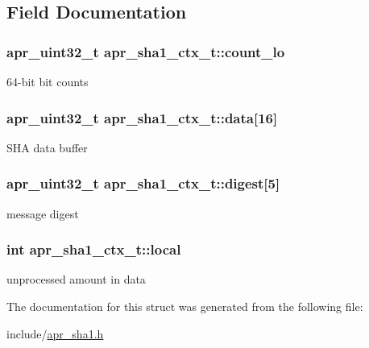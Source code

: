 \subsection{Field Documentation}
\hypertarget{structapr__sha1__ctx__t_ab105efa48b9318a419525e0f6076f6d2}{
\subsubsection[{count\-\_\-lo}]{\setlength{\rightskip}{0pt plus 5cm}apr\-\_\-uint32\-\_\-t apr\-\_\-sha1\-\_\-ctx\-\_\-t\-::count\-\_\-lo}}\label{structapr__sha1__ctx__t_ab105efa48b9318a419525e0f6076f6d2}
64-\/bit bit counts \hypertarget{structapr__sha1__ctx__t_af61fc6c30be244247e35e7c8b0b63407}{
\subsubsection[{data}]{\setlength{\rightskip}{0pt plus 5cm}apr\-\_\-uint32\-\_\-t apr\-\_\-sha1\-\_\-ctx\-\_\-t\-::data\mbox{[}16\mbox{]}}}\label{structapr__sha1__ctx__t_af61fc6c30be244247e35e7c8b0b63407}
S\-H\-A data buffer \hypertarget{structapr__sha1__ctx__t_a152a127b59eb6e1cb686c2bbe00d51de}{
\subsubsection[{digest}]{\setlength{\rightskip}{0pt plus 5cm}apr\-\_\-uint32\-\_\-t apr\-\_\-sha1\-\_\-ctx\-\_\-t\-::digest\mbox{[}5\mbox{]}}}\label{structapr__sha1__ctx__t_a152a127b59eb6e1cb686c2bbe00d51de}
message digest \hypertarget{structapr__sha1__ctx__t_aaa8433058ac7a3b0649821cbab7de822}{
\subsubsection[{local}]{\setlength{\rightskip}{0pt plus 5cm}int apr\-\_\-sha1\-\_\-ctx\-\_\-t\-::local}}\label{structapr__sha1__ctx__t_aaa8433058ac7a3b0649821cbab7de822}
unprocessed amount in data 

The documentation for this struct was generated from the following file\-:\begin{DoxyCompactItemize}
\item 
include/\hyperlink{apr__sha1_8h}{apr\-\_\-sha1.\-h}\end{DoxyCompactItemize}
